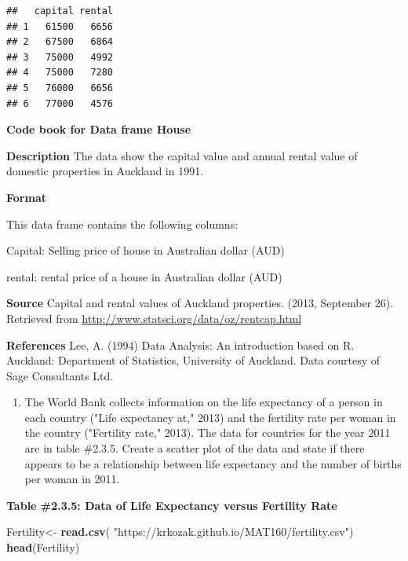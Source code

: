 \documentclass[
]{book}
\newenvironment{Shaded}{\begin{snugshade}}{\end{snugshade}}
\newcommand{\KeywordTok}[1]{\textcolor[rgb]{0.13,0.29,0.53}{\textbf{#1}}}
\newcommand{\NormalTok}[1]{#1}
\newcommand{\StringTok}[1]{\textcolor[rgb]{0.31,0.60,0.02}{#1}}
\providecommand{\tightlist}{%
  \setlength{\itemsep}{0pt}\setlength{\parskip}{0pt}}
\begin{document}
\begin{verbatim}
##   capital rental
## 1   61500   6656
## 2   67500   6864
## 3   75000   4992
## 4   75000   7280
## 5   76000   6656
## 6   77000   4576
\end{verbatim}

\textbf{Code book for Data frame House}

\textbf{Description}
The data show the capital value and annual rental value of domestic properties in Auckland in 1991.

\textbf{Format}

This data frame contains the following columns:

Capital: Selling price of house in Australian dollar (AUD)

rental: rental price of a house in Australian dollar (AUD)

\textbf{Source}
Capital and rental values of Auckland properties. (2013, September 26). Retrieved from
\url{http://www.statsci.org/data/oz/rentcap.html}

\textbf{References}
Lee, A. (1994) Data Analysis: An introduction based on R. Auckland: Department of Statistics, University of Auckland. Data courtesy of Sage Consultants Ltd.

\begin{enumerate}
\def\labelenumi{\arabic{enumi}.}
\setcounter{enumi}{2}
\tightlist
\item
  The World Bank collects information on the life expectancy of a person in each country ("Life expectancy at," 2013) and the fertility rate per woman in the country ("Fertility rate," 2013). The data for countries for the year 2011 are in table \#2.3.5. Create a scatter plot of the data and state if there appears to be a relationship between life expectancy and the number of births per woman in 2011.
\end{enumerate}

\textbf{Table \#2.3.5: Data of Life Expectancy versus Fertility Rate}

\begin{Shaded}
\begin{Highlighting}[]
\NormalTok{Fertility<-}\StringTok{ }\KeywordTok{read.csv}\NormalTok{(}
  \StringTok{"https://krkozak.github.io/MAT160/fertility.csv"}\NormalTok{)}
\KeywordTok{head}\NormalTok{(Fertility)}
\end{Highlighting}
\end{Shaded}
\end{document}
